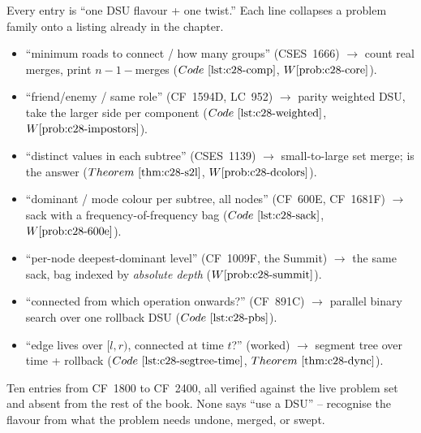 
Every entry is ``one DSU flavour + one twist.'' Each line collapses a problem
family onto a listing already in the chapter.

\begin{itemize}[nosep, leftmargin=1.4em]
  \item ``minimum roads to connect / how many groups'' (CSES~1666)
        \(\to\) count real merges, print \(n-1-\)merges
        (\(\coderef{c28-comp}\), \(\probref{c28-core}\)).
  \item ``friend/enemy / same role'' (CF~1594D, LC~952)
        \(\to\) parity weighted DSU, take the larger side per component
        (\(\coderef{c28-weighted}\), \(\probref{c28-impostors}\)).
  \item ``distinct values in each subtree'' (CSES~1139)
        \(\to\) small-to-large set merge;  is the answer
        (\(\thmref{c28-s2l}\), \(\probref{c28-dcolors}\)).
  \item ``dominant / mode colour per subtree, all nodes'' (CF~600E, CF~1681F)
        \(\to\) sack with a frequency-of-frequency bag
        (\(\coderef{c28-sack}\), \(\probref{c28-600e}\)).
  \item ``per-node deepest-dominant level'' (CF~1009F, the Summit)
        \(\to\) the same sack, bag indexed by \emph{absolute depth}
        (\(\probref{c28-summit}\)).
  \item ``connected from which operation onwards?'' (CF~891C)
        \(\to\) parallel binary search over one rollback DSU
        (\(\coderef{c28-pbs}\)).
  \item ``edge lives over \([l,r)\), connected at time \(t\)?'' (worked)
        \(\to\) segment tree over time + rollback
        (\(\coderef{c28-segtree-time}\), \(\thmref{c28-dync}\)).
\end{itemize}


Ten entries from CF~1800 to CF~2400, all verified against the live problem set
and absent from the rest of the book. None says ``use a DSU'' -- recognise the
flavour from what the problem needs undone, merged, or swept.

